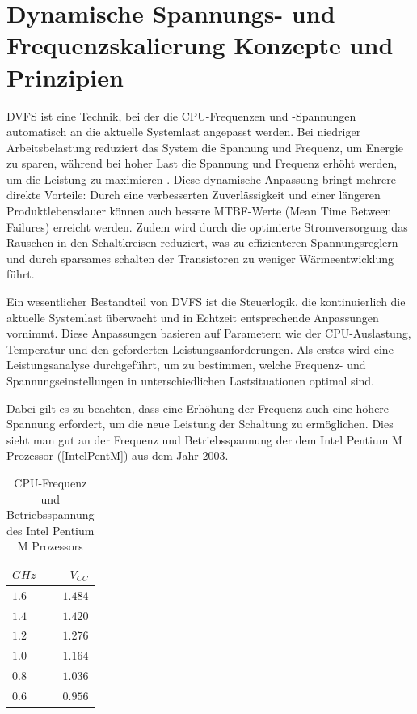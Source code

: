 \documentclass[footmark=none]{tubaf-thesis}
\begin{document}
    	\section{Dynamische Spannungs- und Frequenzskalierung Konzepte und Prinzipien}
    		DVFS ist eine Technik, bei der die CPU-Frequenzen und -Spannungen automatisch an die aktuelle Systemlast angepasst werden. Bei niedriger Arbeitsbelastung reduziert das System die Spannung und Frequenz, um Energie zu sparen, während bei hoher Last die Spannung und Frequenz erhöht werden, um die Leistung zu maximieren \cite{5545490}. Diese dynamische Anpassung bringt mehrere direkte Vorteile: Durch eine verbesserten Zuverlässigkeit und einer längeren Produktlebensdauer können auch bessere MTBF-Werte (Mean Time Between Failures) erreicht werden. Zudem wird durch die optimierte Stromversorgung das Rauschen in den Schaltkreisen reduziert, was zu effizienteren Spannungsreglern und durch sparsames schalten der Transistoren zu weniger Wärmeentwicklung führt. \cite{9441002}
    		
    		Ein wesentlicher Bestandteil von DVFS ist die Steuerlogik, die kontinuierlich die aktuelle Systemlast überwacht und in Echtzeit entsprechende Anpassungen vornimmt. Diese Anpassungen basieren auf Parametern wie der CPU-Auslastung, Temperatur und den geforderten Leistungsanforderungen. Als erstes wird eine Leistungsanalyse durchgeführt, um zu bestimmen, welche Frequenz- und Spannungseinstellungen in unterschiedlichen Lastsituationen optimal sind.
    		
    		Dabei gilt es zu beachten, dass eine Erhöhung der Frequenz auch eine höhere Spannung erfordert, um die neue Leistung der Schaltung zu ermöglichen. Dies sieht man gut an der Frequenz und Betriebsspannung der dem Intel Pentium M Prozessor (\autoref{IntelPentM}) aus dem Jahr 2003. \cite{khabi2018energieeffizienz} 
    		
    		\begin{table}[!ht]
    			\centering
    			\begin{tabular}{l|r}
    				$GHz$ & $V_{CC}$ \\ \hline
    				$1.6$ & $1.484$ \\
    				$1.4$ & $1.420$ \\
    				$1.2$ & $1.276$ \\
    				$1.0$ & $1.164$ \\
    				$0.8$ & $1.036$ \\
    				$0.6$ & $0.956$
    			\end{tabular}
    			\caption{CPU-Frequenz und Betriebsspannung des Intel Pentium M Prozessors \cite{khabi2018energieeffizienz}}
    			\label{IntelPentM}
    		\end{table}
    		
\end{document}
